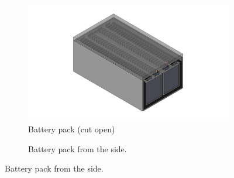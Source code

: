 \begin{figure}[H]
    \centering
    \begin{subfigure}[b]{0.45\textwidth}
        \centering
        \includegraphics[width=\textwidth]{texfiles/elec/eimg/BatteryAssemblyDiag}
        \caption{Battery pack (cut open)}
        \label{img: Batterypack}
    \end{subfigure}
    \hfill
    \begin{subfigure}[b]{0.45\textwidth}
        \centering
        \caption{Battery pack from the side.}
        \label{img: Battery pack from the side}
    \end{subfigure}
    
    \vspace{1cm}
    

\end{figure}
